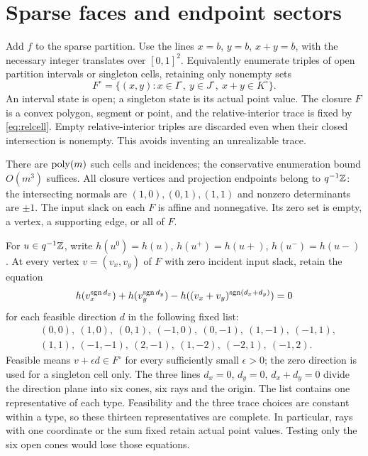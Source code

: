 \documentclass[11pt]{article}
\begin{document}
\section{Sparse faces and endpoint sectors}\label{sec:faces}
Add $f$ to the sparse partition. Use the lines $x=b$, $y=b$, $x+y=b$, with the necessary integer translates over $[0,1]^2$. Equivalently enumerate triples of open partition intervals or singleton cells, retaining only nonempty sets
\begin{equation}\label{eq:relcell}
 F^\circ=\{(x,y):x\in I^\circ,\ y\in J^\circ,\ x+y\in K^\circ\}.
\end{equation}
An interval state is open; a singleton state is its actual point value. The closure $F$ is a convex polygon, segment or point, and the relative-interior trace is fixed by \eqref{eq:relcell}. Empty relative-interior triples are discarded even when their closed intersection is nonempty. This avoids inventing an unrealizable trace.

There are $\operatorname{poly}(m)$ such cells and incidences; the conservative enumeration bound $O(m^3)$ suffices. All closure vertices and projection endpoints belong to $q^{-1}\mathbb Z$: the intersecting normals are $(1,0),(0,1),(1,1)$ and nonzero determinants are $\pm1$. The input slack on each $F$ is affine and nonnegative. Its zero set is empty, a vertex, a supporting edge, or all of $F$.

For $u\in q^{-1}\mathbb Z$, write $h(u^0)=h(u)$, $h(u^+)=h(u+)$, $h(u^-)=h(u-)$. At every vertex $v=(v_x,v_y)$ of $F$ with zero incident input slack, retain the equation
\begin{equation}\label{eq:sector}
 h(v_x^{\operatorname{sgn} d_x})+h(v_y^{\operatorname{sgn} d_y})-
 h((v_x+v_y)^{\operatorname{sgn}(d_x+d_y)})=0
\end{equation}
for each feasible direction $d$ in the following fixed list:
\begin{align*}
 &(0,0),\ (1,0),\ (0,1),\ (-1,0),\ (0,-1),\ (1,-1),\ (-1,1),\\
 &(1,1),\ (-1,-1),\ (2,-1),\ (1,-2),\ (-2,1),\ (-1,2).
\end{align*}
Feasible means $v+\epsilon d\in F^\circ$ for every sufficiently small $\epsilon>0$; the zero direction is used for a singleton cell only. The three lines $d_x=0$, $d_y=0$, $d_x+d_y=0$ divide the direction plane into six cones, six rays and the origin. The list contains one representative of each type. Feasibility and the three trace choices are constant within a type, so these thirteen representatives are complete. In particular, rays with one coordinate or the sum fixed retain actual point values. Testing only the six open cones would lose those equations.
\end{document}
